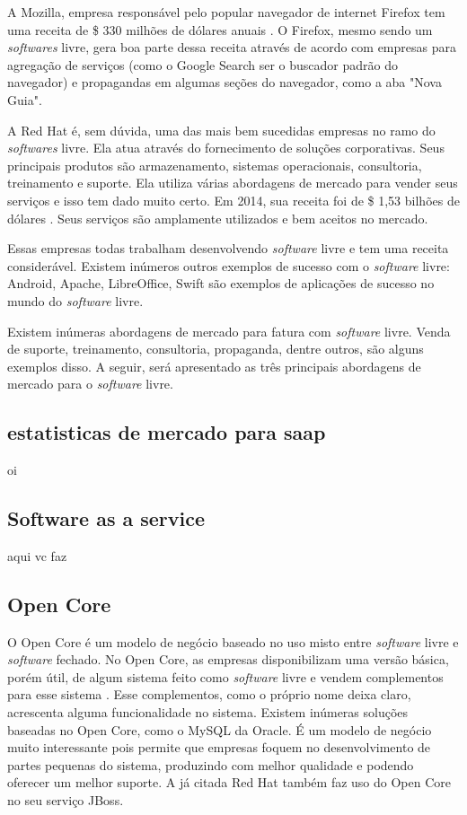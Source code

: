 \documentclass{classe_cn}                 %
\begin{document}
A Mozilla, empresa responsável pelo popular navegador de internet Firefox tem uma receita de \$ 330 milhões de dólares anuais \cite{Mozilla}. O Firefox, mesmo sendo  um \textit{softwares} livre, gera boa parte dessa receita através de acordo com empresas para agregação de serviços (como o Google Search ser o buscador padrão do navegador) e propagandas em algumas seções do navegador, como a aba "Nova Guia".

A Red Hat é, sem dúvida, uma das mais bem sucedidas empresas no ramo do \textit{softwares} livre. Ela atua através do fornecimento de soluções corporativas. Seus principais produtos são armazenamento, sistemas operacionais, consultoria, treinamento e suporte. Ela utiliza várias abordagens de mercado para vender seus serviços e isso tem dado muito certo. Em 2014, sua receita foi de \$ 1,53 bilhões de dólares \cite{Red}. Seus serviços são amplamente utilizados e bem aceitos no mercado.

Essas empresas todas trabalham desenvolvendo \textit{software} livre e tem uma receita considerável. Existem inúmeros outros exemplos de sucesso com o \textit{software} livre: Android, Apache, LibreOffice, Swift são exemplos de aplicações de sucesso no mundo do \textit{software} livre. 

Existem inúmeras abordagens de mercado para fatura com \textit{software} livre. Venda de suporte, treinamento, consultoria, propaganda, dentre outros, são alguns exemplos disso. A seguir, será apresentado as três principais abordagens de mercado para o \textit{software} livre.

\subsection{estatisticas de mercado para saap}
oi


\subsection{Software as a service}

aqui vc faz

\subsection{Open Core}

O Open Core é um modelo de negócio baseado no uso misto entre \textit{software} livre e \textit{software} fechado. No Open Core, as empresas disponibilizam uma versão básica, porém útil, de algum sistema feito como \textit{software} livre e vendem complementos para esse sistema \cite{riehle2012single}. Esse complementos, como o próprio nome deixa claro, acrescenta alguma funcionalidade no sistema. Existem inúmeras soluções baseadas no Open Core, como o MySQL da Oracle. É um modelo de negócio muito interessante pois permite que empresas foquem no desenvolvimento de partes pequenas do sistema, produzindo com melhor qualidade e podendo oferecer um melhor suporte.
A já citada Red Hat também faz uso do Open Core no seu serviço JBoss. 
\end{document}
